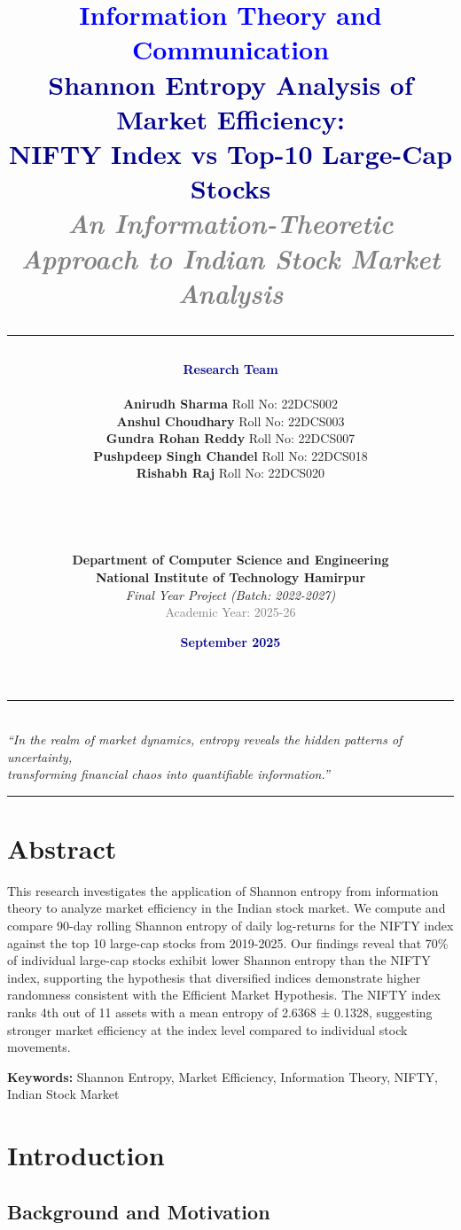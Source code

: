 \documentclass[12pt,a4paper]{article}
\title{
    \vspace{-1cm}
    {\Large \textcolor{blue}{\textbf{Information Theory and Communication}}} \\[1cm]
    {\Huge \textcolor{darkblue}{\textbf{Shannon Entropy Analysis of Market Efficiency:}}} \\[0.4cm]
    {\huge \textcolor{darkblue}{\textbf{NIFTY Index vs Top-10 Large-Cap Stocks}}} \\[0.6cm]
    {\Large \textcolor{gray}{\textit{An Information-Theoretic Approach to Indian Stock Market Analysis}}} \\[0.3cm]
    {\large \textcolor{red}{\rule{8cm}{0.5pt}}}
}
\author{
    \vspace{0.5cm}
    {\large \textbf{\textcolor{darkblue}{Research Team}}} \\[0.5cm]
    \begin{tabular}{c}
    \textbf{Anirudh Sharma} \quad Roll No: 22DCS002 \\[0.2cm]
    \textbf{Anshul Choudhary} \quad Roll No: 22DCS003 \\[0.2cm]
    \textbf{Gundra Rohan Reddy} \quad Roll No: 22DCS007 \\[0.2cm]
    \textbf{Pushpdeep Singh Chandel} \quad Roll No: 22DCS018 \\[0.2cm]
    \textbf{Rishabh Raj} \quad Roll No: 22DCS020 \\[0.6cm]
    \end{tabular} \\
    {\large \textcolor{red}{\rule{6cm}{0.3pt}}} \\[0.4cm]
    {\large \textbf{Department of Computer Science and Engineering}} \\[0.2cm]
    {\large \textbf{National Institute of Technology Hamirpur}} \\[0.3cm]
    {\normalsize \textit{Final Year Project (Batch: 2022-2027)}} \\[0.4cm]
    {\normalsize \textcolor{gray}{Academic Year: 2025-26}}
}
\date{
    \vspace{1cm}
    {\large \textcolor{darkblue}{\textbf{September 2025}}}
}
\begin{document}
\maketitle
\thispagestyle{empty}

\vfill
\begin{center}
    \textcolor{gray}{\rule{12cm}{0.5pt}} \\[0.3cm]
    {\small \textit{``In the realm of market dynamics, entropy reveals the hidden patterns of uncertainty,}} \\
    {\small \textit{transforming financial chaos into quantifiable information.''}} \\[0.3cm]
    \textcolor{gray}{\rule{12cm}{0.5pt}}
\end{center}
\vfill

\newpage

\tableofcontents
\newpage

\listoffigures
\vspace{1cm}
\listoftables
\newpage

\section{Abstract}

This research investigates the application of Shannon entropy from information theory to analyze market efficiency in the Indian stock market. We compute and compare 90-day rolling Shannon entropy of daily log-returns for the NIFTY index against the top 10 large-cap stocks from 2019-2025. Our findings reveal that 70\% of individual large-cap stocks exhibit lower Shannon entropy than the NIFTY index, supporting the hypothesis that diversified indices demonstrate higher randomness consistent with the Efficient Market Hypothesis. The NIFTY index ranks 4th out of 11 assets with a mean entropy of 2.6368 ± 0.1328, suggesting stronger market efficiency at the index level compared to individual stock movements.

\textbf{Keywords:} Shannon Entropy, Market Efficiency, Information Theory, NIFTY, Indian Stock Market

\section{Introduction}

\subsection{Background and Motivation}
\end{document}
